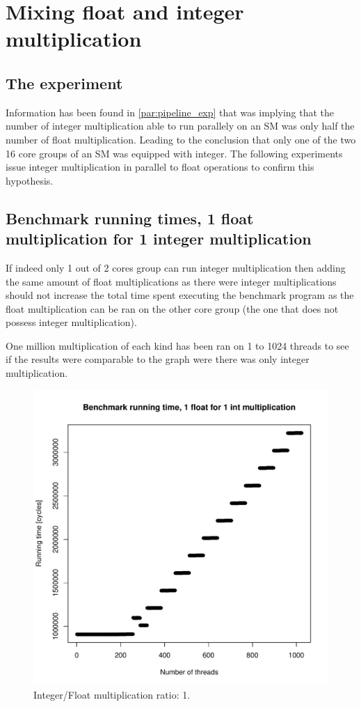 \documentclass{report}
\def \scalingfactor{.8}
\begin{document}
\section{Mixing float and integer multiplication}
	\subsection{The experiment}
	Information has been found in \ref{par:pipeline_exp} that was implying that the number of 
    integer multiplication able to run parallely on an SM was only half the number of 
    float multiplication. Leading to the conclusion that only one of
    the two 16 core groups of an SM was equipped with integer. The following experiments issue 
    integer multiplication in parallel to float operations to confirm this hypothesis.
	\subsection{Benchmark running times, 1 float multiplication for 1 integer multiplication}
	If indeed only 1 out of 2 cores group can run integer multiplication then
    adding the same amount of float multiplications as there were integer
    multiplications should not increase the total time spent executing the benchmark 
    program as the float multiplication can
    be ran on the other core group (the one that does not possess integer multiplication).
	
	One million multiplication of each kind has been ran on 1 to 1024 threads to
    see if the results were comparable to the graph were there was only integer multiplication.
	\begin{figure}[H]
		\centering
    			\includegraphics[width=\scalingfactor\linewidth]{"graphics/running_times_ratio11"}
		\vspace{-15pt}
		\captionsetup{justification=centering}
		\caption{Integer/Float multiplication ratio: 1.}
	\end{figure}
	\pagebreak
\end{document}
